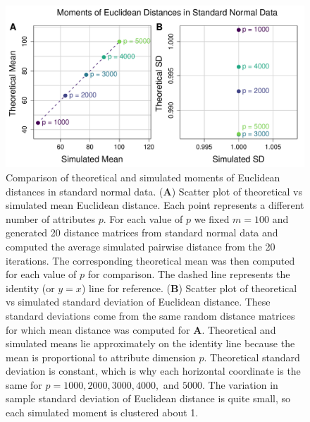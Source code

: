 \documentclass[10pt,letterpaper]{article}\usepackage[]{graphicx}\usepackage[]{color}
\begin{document}
\begin{figure}[H]
	\includegraphics[width=\textwidth]{compared_moments_normal_euclidean_standard.pdf}
	\caption{Comparison of theoretical and simulated moments of Euclidean distances in standard normal data. (\textbf{A}) Scatter plot of theoretical vs simulated mean Euclidean distance. Each point represents a different number of attributes $p$. For each value of $p$ we fixed $m=100$ and generated 20 distance matrices from standard normal data and computed the average simulated pairwise distance from the 20 iterations. The corresponding theoretical mean was then computed for each value of $p$ for comparison. The dashed line represents the identity (or $y=x$) line for reference. (\textbf{B}) Scatter plot of theoretical vs simulated standard deviation of Euclidean distance. These standard deviations come from the same random distance matrices for which mean distance was computed for \textbf{A}. Theoretical and simulated means lie approximately on the identity line because the mean is proportional to attribute dimension $p$. Theoretical standard deviation is constant, which is why each horizontal coordinate is the same for $p=1000,2000,3000,4000,$ and $5000$. The variation in sample standard deviation of Euclidean distance is quite small, so each simulated moment is clustered about 1.}
\end{figure}
\end{document}
